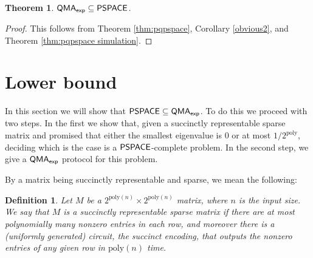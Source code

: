 \documentclass[11pt]{article}
\newtheorem{theorem}{Theorem}
\newtheorem{definition}{Definition}
\theoremstyle{definition}
\theoremstyle{remark}
\newcommand\PSPACE{{\sf{PSPACE}}}
\newcommand\QMAexp{{\sf{QMA}_{exp}}}
\newcommand{\poly}{\mathrm{poly}}
\begin{document}
\begin{theorem} \label{thm: pspace upper bound}
$\QMAexp\subseteq\PSPACE$.
\end{theorem}
\begin{proof}
This follows from Theorem \ref{thm:pqpspace}, Corollary \ref{obvious2}, and Theorem \ref{thm:pqpspace simulation}.
\end{proof}

\section{Lower bound}
In this section we will show that $\PSPACE\subseteq\QMAexp$.  To do this we proceed with two steps.  In the first we show that, given a succinctly representable sparse matrix and promised that either the smallest eigenvalue is 0 or at most $1/2^{\poly}$, deciding which is the case is a $\PSPACE$-complete problem.  In the second step, we give a $\QMAexp$ protocol for this problem.

By a matrix being succinctly representable and sparse, we mean the following:
\begin{definition}
Let $M$ be a $2^{\poly(n)} \times 2^{\poly(n)}$ matrix, where $n$ is the input size. We say that $M$ is a \emph{succinctly representable sparse} matrix if there are at most polynomially many nonzero entries in each row, and moreover there is a (uniformly generated) circuit, \emph{the succinct encoding}, that outputs the nonzero entries of any given row in $\poly(n)$ time.
\end{definition}
\end{document}
